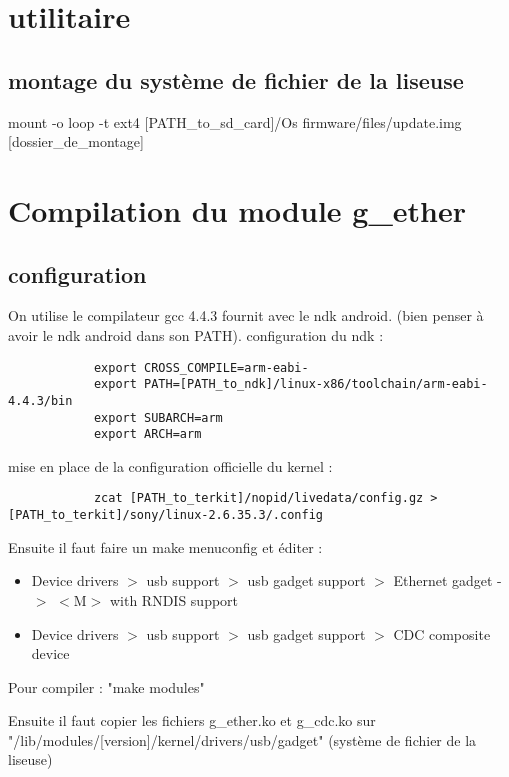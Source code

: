 \section {utilitaire}
\subsection{montage du système de fichier de la liseuse}
	mount -o loop -t ext4 [PATH_to_sd_card]/Os firmware/files/update.img  [dossier_de_montage]


\section{Compilation du module g_ether}
	\subsection{configuration}
		On utilise le compilateur gcc 4.4.3 fournit avec le ndk android.
		(bien penser à avoir le ndk android dans son PATH).
		configuration du ndk : 
		\begin{verbatim}
			export CROSS_COMPILE=arm-eabi-
			export PATH=[PATH_to_ndk]/linux-x86/toolchain/arm-eabi-4.4.3/bin
			export SUBARCH=arm
			export ARCH=arm
		\end{verbatim}
		mise en place de la configuration officielle du kernel : 
		\begin{verbatim}
			zcat [PATH_to_terkit]/nopid/livedata/config.gz >[PATH_to_terkit]/sony/linux-2.6.35.3/.config
		\end{verbatim}
		Ensuite il faut faire un make menuconfig et éditer  : 
			\begin{itemize}
				\item  Device drivers $>$ usb support $>$ usb gadget support $>$ Ethernet gadget -$>$ $<$M$>$ with RNDIS support
				\item Device drivers $>$ usb support $>$ usb gadget support $>$ CDC composite device
			\end{itemize}

Pour compiler : "make modules"
		
		Ensuite il faut copier les fichiers g_ether.ko et g_cdc.ko sur "/lib/modules/[version]/kernel/drivers/usb/gadget" (système de fichier de la liseuse)
	
